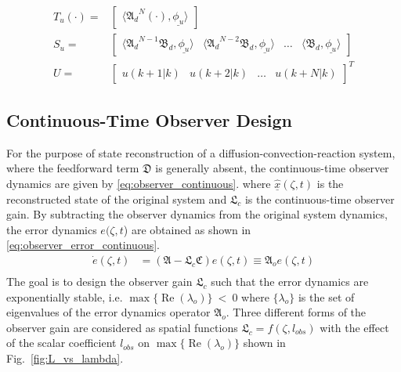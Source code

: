 \begin{equation}
\begin{aligned}
        T_u (\cdot) = &\begin{bmatrix}
            \langle {\mathfrak{A}_d}^{N} (\cdot), \underline{\phi_u} \rangle
        \end{bmatrix} \\
        S_u = &\begin{bmatrix}
            \langle {\mathfrak{A}_d}^{N-1} \mathfrak{B}_d, \underline{\phi_u} \rangle & 
            \langle {\mathfrak{A}_d}^{N-2} \mathfrak{B}_d, \underline{\phi_u} \rangle &
            \hdots &
            \langle \mathfrak{B}_d, \underline{\phi_u} \rangle
        \end{bmatrix} \\
        U = &\begin{bmatrix}
            u(k+1|k) & u(k+2|k) & \hdots & u(k+N|k)
        \end{bmatrix}^T
    \end{aligned}
\end{equation}


\subsection{Continuous-Time Observer Design}
For the purpose of state reconstruction of a diffusion-convection-reaction system, where the feedforward term $\mathfrak{D}$ is generally absent, the continuous-time observer dynamics are given by \eqref{eq:observer_continuous}.
where $\underline{\hat{x}}(\zeta, t)$ is the reconstructed state of the original system and $\mathfrak{L}_c$ is the continuous-time observer gain. By subtracting the observer dynamics from the original system dynamics, the error dynamics $e(\zeta,t$) are obtained as shown in \eqref{eq:observer_error_continuous}.
\begin{equation} \label{eq:observer_error_continuous}
    \begin{aligned}
        \dot{e}(\zeta, t) &= (\mathfrak{A} - \mathfrak{L}_c \mathfrak{C}) e(\zeta, t) \equiv \mathfrak{A}_o e(\zeta,t) \\
    \end{aligned}
\end{equation}
The goal is to design the observer gain $\mathfrak{L}_c$ such that the error dynamics are exponentially stable, i.e. $\max\{\operatorname{Re}(\lambda_{o})\}~<~0$ where $\{\lambda_{o}\}$ is the set of eigenvalues of the error dynamics operator $\mathfrak{A}_o$. Three different forms of the observer gain are considered as spatial functions $\mathfrak{L}_c = f(\zeta, l_{obs})$ with the effect of the scalar coefficient $l_{obs}$ on $\max\{\operatorname{Re}(\lambda_{o})\}$ shown in Fig.~\ref{fig:L_vs_lambda}.

